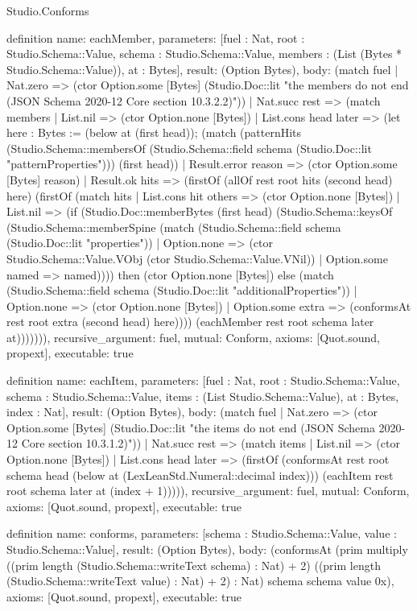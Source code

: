 \begin{lexlean}{Studio.Conforms}
\begin{semanticmodule}
definition{
  name: eachMember,
  parameters: [fuel : Nat, root : Studio.Schema::Value, schema : Studio.Schema::Value, members : (List (Bytes * Studio.Schema::Value)), at : Bytes],
  result: (Option Bytes),
  body: (match fuel
    | Nat.zero => (ctor Option.some [Bytes] (Studio.Doc::lit "the members do not end (JSON Schema 2020-12 Core section 10.3.2.2)"))
    | Nat.succ rest => (match members
      | List.nil => (ctor Option.none [Bytes])
      | List.cons head later => (let here : Bytes := (below at (first head)); (match (patternHits (Studio.Schema::membersOf (Studio.Schema::field schema (Studio.Doc::lit "patternProperties"))) (first head))
        | Result.error reason => (ctor Option.some [Bytes] reason)
        | Result.ok hits => (firstOf (allOf rest root hits (second head) here) (firstOf (match hits
          | List.cons hit others => (ctor Option.none [Bytes])
          | List.nil => (if (Studio.Doc::memberBytes (first head) (Studio.Schema::keysOf (Studio.Schema::memberSpine (match (Studio.Schema::field schema (Studio.Doc::lit "properties"))
            | Option.none => (ctor Studio.Schema::Value.VObj (ctor Studio.Schema::Value.VNil))
            | Option.some named => named)))) then (ctor Option.none [Bytes]) else (match (Studio.Schema::field schema (Studio.Doc::lit "additionalProperties"))
            | Option.none => (ctor Option.none [Bytes])
            | Option.some extra => (conformsAt rest root extra (second head) here)))) (eachMember rest root schema later at))))))),
  recursive_argument: fuel,
  mutual: Conform,
  axioms: [Quot.sound, propext],
  executable: true
}

definition{
  name: eachItem,
  parameters: [fuel : Nat, root : Studio.Schema::Value, schema : Studio.Schema::Value, items : (List Studio.Schema::Value), at : Bytes, index : Nat],
  result: (Option Bytes),
  body: (match fuel
    | Nat.zero => (ctor Option.some [Bytes] (Studio.Doc::lit "the items do not end (JSON Schema 2020-12 Core section 10.3.1.2)"))
    | Nat.succ rest => (match items
      | List.nil => (ctor Option.none [Bytes])
      | List.cons head later => (firstOf (conformsAt rest root schema head (below at (LexLeanStd.Numeral::decimal index))) (eachItem rest root schema later at (index + 1))))),
  recursive_argument: fuel,
  mutual: Conform,
  axioms: [Quot.sound, propext],
  executable: true
}

definition{
  name: conforms,
  parameters: [schema : Studio.Schema::Value, value : Studio.Schema::Value],
  result: (Option Bytes),
  body: (conformsAt (prim multiply ((prim length (Studio.Schema::writeText schema) : Nat) + 2) ((prim length (Studio.Schema::writeText value) : Nat) + 2) : Nat) schema schema value 0x),
  axioms: [Quot.sound, propext],
  executable: true
}


\end{semanticmodule}
\end{lexlean}
